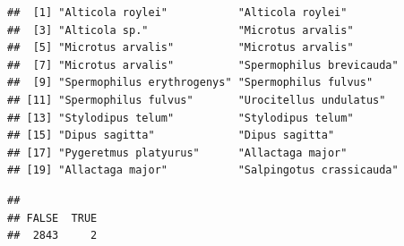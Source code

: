 \documentclass[
]{article}
\newenvironment{Shaded}{\begin{snugshade}}{\end{snugshade}}
\newcommand{\CommentTok}[1]{\textcolor[rgb]{0.56,0.35,0.01}{\textit{#1}}}
\newcommand{\ConstantTok}[1]{\textcolor[rgb]{0.56,0.35,0.01}{#1}}
\newcommand{\DecValTok}[1]{\textcolor[rgb]{0.00,0.00,0.81}{#1}}
\newcommand{\FunctionTok}[1]{\textcolor[rgb]{0.13,0.29,0.53}{\textbf{#1}}}
\newcommand{\NormalTok}[1]{#1}
\newcommand{\SpecialCharTok}[1]{\textcolor[rgb]{0.81,0.36,0.00}{\textbf{#1}}}
\newcommand{\StringTok}[1]{\textcolor[rgb]{0.31,0.60,0.02}{#1}}
\begin{document}
\begin{Shaded}
\end{Shaded}

\begin{verbatim}
##  [1] "Alticola roylei"           "Alticola roylei"          
##  [3] "Alticola sp."              "Microtus arvalis"         
##  [5] "Microtus arvalis"          "Microtus arvalis"         
##  [7] "Microtus arvalis"          "Spermophilus brevicauda"  
##  [9] "Spermophilus erythrogenys" "Spermophilus fulvus"      
## [11] "Spermophilus fulvus"       "Urocitellus undulatus"    
## [13] "Stylodipus telum"          "Stylodipus telum"         
## [15] "Dipus sagitta"             "Dipus sagitta"            
## [17] "Pygeretmus platyurus"      "Allactaga major"          
## [19] "Allactaga major"           "Salpingotus crassicauda"
\end{verbatim}

\begin{Shaded}
\end{Shaded}

\begin{verbatim}
## 
## FALSE  TRUE 
##  2843     2
\end{verbatim}
\end{document}
